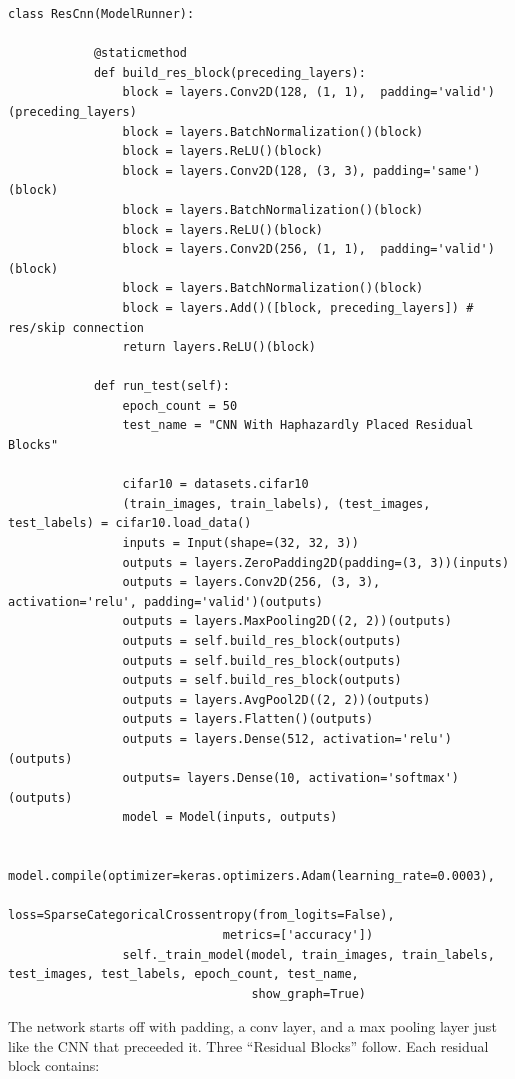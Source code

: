 \documentclass{article}
\begin{document}
    \begin{lstlisting}[label={lst:bigger}]
        class ResCnn(ModelRunner):

            @staticmethod
            def build_res_block(preceding_layers):
                block = layers.Conv2D(128, (1, 1),  padding='valid')(preceding_layers)
                block = layers.BatchNormalization()(block)
                block = layers.ReLU()(block)
                block = layers.Conv2D(128, (3, 3), padding='same')(block)
                block = layers.BatchNormalization()(block)
                block = layers.ReLU()(block)
                block = layers.Conv2D(256, (1, 1),  padding='valid')(block)
                block = layers.BatchNormalization()(block)
                block = layers.Add()([block, preceding_layers]) # res/skip connection
                return layers.ReLU()(block)

            def run_test(self):
                epoch_count = 50
                test_name = "CNN With Haphazardly Placed Residual Blocks"

                cifar10 = datasets.cifar10
                (train_images, train_labels), (test_images, test_labels) = cifar10.load_data()
                inputs = Input(shape=(32, 32, 3))
                outputs = layers.ZeroPadding2D(padding=(3, 3))(inputs)
                outputs = layers.Conv2D(256, (3, 3), activation='relu', padding='valid')(outputs)
                outputs = layers.MaxPooling2D((2, 2))(outputs)
                outputs = self.build_res_block(outputs)
                outputs = self.build_res_block(outputs)
                outputs = self.build_res_block(outputs)
                outputs = layers.AvgPool2D((2, 2))(outputs)
                outputs = layers.Flatten()(outputs)
                outputs = layers.Dense(512, activation='relu')(outputs)
                outputs= layers.Dense(10, activation='softmax')(outputs)
                model = Model(inputs, outputs)

                model.compile(optimizer=keras.optimizers.Adam(learning_rate=0.0003),
                              loss=SparseCategoricalCrossentropy(from_logits=False),
                              metrics=['accuracy'])
                self._train_model(model, train_images, train_labels, test_images, test_labels, epoch_count, test_name,
                                  show_graph=True)
    \end{lstlisting}

    The network starts off with padding, a conv layer, and a max pooling layer just like the CNN that preceeded it.
    Three ``Residual Blocks'' follow.
    Each residual block contains:
\end{document}

